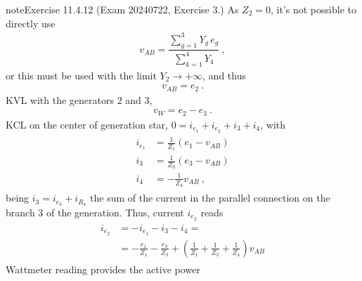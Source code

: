 \documentclass[letterpaper,10pt,english]{jupyterBook}
\begin{document}
\begin{sphinxadmonition}{note}{Exercise 11.4.12 (Exam 2024\sphinxhyphen{}07\sphinxhyphen{}22, Exercise 3.)}
\sphinxAtStartPar
{} As \(Z_2 = 0\), it’s not possible to directly use
\begin{equation*}
\begin{split}v_{AB} = \dfrac{ \sum_{g=1}^{3} Y_g \, e_g }{\sum_{k=1}^{4} Y_4} \ ,\end{split}
\end{equation*}
\sphinxAtStartPar
or this must be used with the limit \(Y_2 \rightarrow + \infty\), and thus
\begin{equation*}
\begin{split}v_{AB} = e_2 \ .\end{split}
\end{equation*}
\sphinxAtStartPar
{} KVL with the generators \(2\) and \(3\),
\begin{equation*}
\begin{split}v_W = e_2 - e_3 \ .\end{split}
\end{equation*}
\sphinxAtStartPar
{} KCL on the center of generation star, \(0 = i_{e_1} + i_{e_2} + i_{3} + i_{4}\), with
\begin{equation*}
\begin{split}\begin{aligned}
  i_{e_1} & =  \frac{1}{Z_1} ( e_1 - v_{AB} ) \\
  i_{3}   & =  \frac{1}{Z_3} ( e_3 - v_{AB} ) \\
  i_{4}   & = -\frac{1}{Z_4}   v_{AB}   \ ,
\end{aligned}\end{split}
\end{equation*}
\sphinxAtStartPar
being \(i_3 = i_{e_3} + i_{R_4}\) the sum of the current in the parallel connection on the branch \(3\) of the generation. Thus, current \(i_{e_2}\) reads
\begin{equation*}
\begin{split}\begin{aligned}
  i_{e_2} 
  & = - i_{e_1} - i_{3} - i_{4} = \\
  & = - \frac{e_1}{Z_1} - \frac{e_3}{Z_3} + \left(  \frac{1}{Z_1} + \frac{1}{Z_3} + \frac{1}{Z_4}  \right) v_{AB}
\end{aligned}\end{split}
\end{equation*}
\sphinxAtStartPar
{} Wattmeter reading provides the active power
\begin{equation*}

\end{equation*}
\end{sphinxadmonition}
\end{document}
